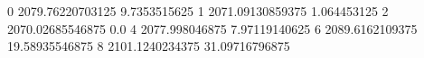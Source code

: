 0 2079.76220703125 9.7353515625
1 2071.09130859375 1.064453125
2 2070.02685546875 0.0
4 2077.998046875 7.97119140625
6 2089.6162109375 19.58935546875
8 2101.1240234375 31.09716796875
